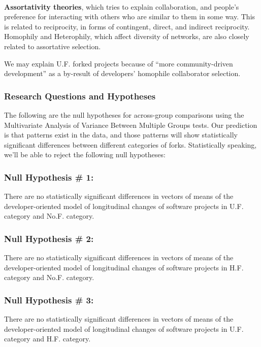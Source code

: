 \documentclass[11pt]{report}
\begin{document}
\paragraph{} \textbf{Assortativity theories}, which tries to explain collaboration, and people's preference for interacting with others who are similar to them in some way. This is related to reciprocity, in forms of contingent, direct, and indirect reciprocity. Homophily and Heterophily, which affect diversity of networks, are also closely related to assortative selection.

We may explain U.F. forked projects because of ``more community-driven development'' as a by-result of developers' homophile collaborator selection.


\subsubsection{Research Questions and Hypotheses}
The following are the null hypotheses for across-group comparisons using the Multivariate Analysis of Variance Between Multiple Groups tests. Our prediction is that patterns exist in the data, and those patterns will show statistically significant differences between different categories of forks. Statistically speaking, we'll be able to reject the following null hypotheses:

\subsubsection{Null Hypothesis \# 1:} 
\hspace{10 mm} There are no statistically significant differences in vectors of means of the developer-oriented model of longitudinal changes of software projects in U.F. category and No.F. category.

\subsubsection{Null Hypothesis \# 2:} 
\hspace{10 mm} There are no statistically significant differences in vectors of means of the developer-oriented model of longitudinal changes of software projects in H.F. category and No.F. category.

\subsubsection{Null Hypothesis \# 3:} 
\hspace{10 mm} There are no statistically significant differences in vectors of means of the developer-oriented model of longitudinal changes of software projects in U.F. category and H.F. category.\\
\end{document}
